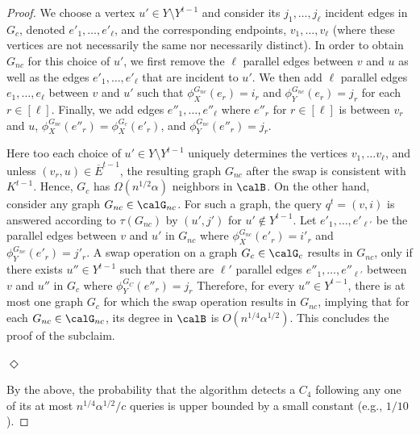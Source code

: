 \begin{proof}
 We choose a vertex $u'\in Y\setminus Y^{t-1}$  and consider its $j_1,\dots,j_\ell$ incident edges in $G_c$, denoted $e'_1,\dots,e'_\ell$, and the corresponding endpoints,
$v_1, \ldots, v_{\ell}$ (where these vertices are not necessarily the same nor necessarily distinct).
 In order to obtain $G_{nc}$ for this choice of $u'$, we first remove the $\ell$ parallel edges between $v$ and $u$ as well as the edges %
 $e'_1,\dots,e'_\ell$ that are incident to $u'$.
 We then  add $\ell$ parallel edges $e_1,\dots,e_\ell$ between $v$ and $u'$
 such that $\phi^{G_{nc}}_X(e_r)= i_r$ and $\phi^{G_{nc}}_Y(e_r)= j_r$ for each $r \in [\ell]$. Finally, we  add edges $e''_1,\dots,e''_\ell$ where $e''_r$ for $r\in [\ell]$ is between $v_{r}$ and $u$, $\phi^{G_{nc}}_X(e''_r) = \phi^{G_c}_X(e'_r)$, and $\phi^{G_{nc}}_Y(e''_r) = j_r$.


  Here too each choice of $u'\in Y\setminus Y^{t-1}$ uniquely determines the vertices $v_1, \ldots v_{\ell}$, and unless $(v_{r},u)\in \overline{E}^{t-1}$, the resulting graph $G_{nc}$ after the swap is consistent with $K^{t-1}$. Hence,  $G_c$ has $\Omega(n^{1/2}\alpha)$ neighbors in $\calB$.
    On the other hand,  consider any graph $G_{nc} \in \calG_{nc}$.
    For such a graph, the query $q^t = (v,i)$ is answered according to $\tau(G_{nc})$ by $(u',j')$ for $u' \notin Y^{t-1}$.
    Let $e'_1,\dots,e'_{\ell'}$ be the parallel edges between $v$
    and $u'$ in $G_{nc}$ where $\phi^{G_{nc}}_X(e'_r)=i'_r$ and
    $\phi^{G_{nc}}_Y(e'_r)=j'_r$.
    A swap operation on a graph $G_{c} \in \calG_c$ results in $G_{nc}$, only if there exists $u''\in Y^{t-1}$ such that
    there are $\ell'$ parallel edges $e''_1,\dots,e''_{\ell'}$ between $v$ and $u''$ in $G_c$ where $\phi^{G_C}_Y(e''_r)=j_r$
    Therefore, for every  $u''\in Y^{t-1}$, there  is at most  one graph $G_c$ for which the swap operation results in $G_{nc}$, implying that for each $G_{nc}\in \calG_{nc}$, its degree in $\calB$ is $O(n^{1/4}\alpha^{1/2})$. This concludes the proof of the subclaim.
\fi
  {\hspace*{\fill}$\Diamond$\par}

\smallskip
By the above, the probability that the algorithm detects a $C_4$ following any one of its at most
$n^{1/4}\alpha^{1/2}/c$ queries is upper bounded by a small constant (e.g., $1/10$).
\end{proof}


